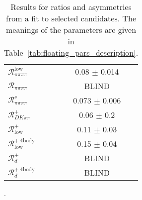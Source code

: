 \begin{table}[h]
\begin{tabular}{lc}
      $\mathcal{R}_{\pi\pi\pi\pi}^\mathrm{low}$ & 0.08 $\pm$ 0.014 \\
      $\mathcal{R}_{\pi\pi\pi\pi}$ & BLIND \\
      $\mathcal{R}_{\pi\pi\pi\pi}^s$ & 0.073 $\pm$ 0.006 \\
      $\mathcal{R}_{DK\pi\pi}^+$ & 0.06 $\pm$ 0.2 \\
      $\mathcal{R}_\mathrm{low}^+$ & 0.11 $\pm$ 0.03 \\
      $\mathcal{R}_\mathrm{low}^{+\ \mathrm{4body}}$ & 0.15 $\pm$ 0.04 \\
      $\mathcal{R}_d^+$ & BLIND \\
      $\mathcal{R}_d^{+\ \mathrm{4body}}$ & BLIND \\
      \bottomrule
  \end{tabular}
  \caption{Results for ratios and asymmetries  from a fit to selected candidates. The meanings of the parameters are given in Table~\ref{tab:floating_pars_description}.}.
\label{tab:floating_pars_obs}
\end{table}
